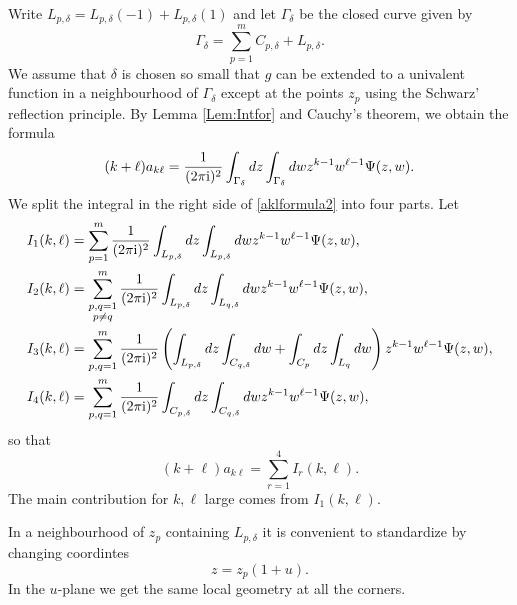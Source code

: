 \documentclass{article}
\numberwithin{equation}{section}
\numberwithin{figure}{section}
\theoremstyle{plain}
\theoremstyle{plain}
\numberwithin{thm}{section}
\theoremstyle{remark}
\newcommand{\I}{{\rm i}}
\begin{document}
Write $L_{p,\delta}=L_{p,\delta}(-1)+L_{p,\delta}(1)$ and let $\Gamma_\delta$ be the closed curve given by
\begin{equation}\label{Gammadelta}
\Gamma_\delta=\sum_{p=1}^mC_{p,\delta}+L_{p,\delta}.
\end{equation}
We assume that $\delta$ is chosen so small that $g$ can be extended to a univalent function in a neighbourhood of $\Gamma_\delta$ except at the points $z_p$ using
the Schwarz' reflection principle. By Lemma \ref{Lem:Intfor} and Cauchy's theorem, we obtain the formula
\begin{equation}\label{aklformula2}
(k+\ell)a_{k\ell}=\frac 1{(2\pi\I)^2}\int_{\Gamma_\delta}dz\int_{\Gamma_\delta}dw z^{k-1}w^{\ell-1}\Psi(z,w).
\end{equation}
We split the integral in the right side of \eqref{aklformula2} into four parts. Let
\begin{align}\label{Ikl1}
I_1(k,\ell)&=\sum_{p=1}^m\frac 1{(2\pi\I)^2}\int_{L_{p,\delta}}dz\int_{L_{p, \delta}}dw z^{k-1}w^{\ell-1}\Psi(z,w),\\
\label{Ikl2}
I_2(k,\ell)&=\sum_{\substack{
   p,q=1\\p\neq q}}^m\frac 1{(2\pi\I)^2}\int_{L_{p,\delta}}dz\int_{L_{q,\delta}}dw z^{k-1}w^{\ell-1}\Psi(z,w),\\
\label{Ikl3}
I_3(k,\ell)&=\sum_{p,q=1}^m\frac 1{(2\pi\I)^2}\left(\int_{L_{p,\delta}}dz\int_{C_{q,\delta}}dw +\int_{C_p}dz\int_{L_q}dw\right) z^{k-1}w^{\ell-1}\Psi(z,w),\\
\label{Ikl4}
I_4(k,\ell)&=\sum_{p,q=1}^m\frac 1{(2\pi\I)^2}\int_{C_{p,\delta}}dz\int_{C_{q,\delta}}dw z^{k-1}w^{\ell-1}\Psi(z,w),
\end{align}
so that 
\begin{equation}\label{aklsplit}
(k+\ell)a_{k\ell}=\sum_{r=1}^4I_r(k,\ell).
\end{equation}
The main contribution for $k,\ell$ large comes from $I_1(k,\ell)$. 

In a neighbourhood of $z_p$ containing $L_{p,\delta}$ it is convenient to standardize by changing coordintes
\begin{equation}\label{zu}
z=z_p(1+u).
\end{equation}
In the $u$-plane we get the same local geometry at all the corners.

\end{document}

